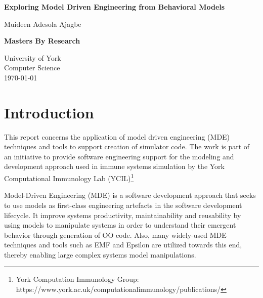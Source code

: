 \documentclass[12pt, a4paper]{report}
\begin{document}
\begin{titlepage}
 \begin{center}
\vspace{2cm}
\textbf{\large Exploring Model Driven Engineering from Behavioral Models}
\vspace{2cm}

Muideen Adesola Ajagbe\\

\vspace{3cm}

\textbf{Masters By Research}
\vspace{3cm}


University of York\\
Computer Science\\
\vspace{3cm}
\today
 
\vfill
 
\end{center}
\end{titlepage}

\begin{abstract}



\end{abstract}


\chapter{Introduction}

This report concerns the application of model driven engineering (MDE) techniques and tools to support creation of simulator code.  The work is part of an initiative to provide software engineering support for the modeling and development approach used in immune systems simulation by the York Computational Immunology Lab (YCIL)\footnote{York Computation Immunology Group: https://www.york.ac.uk/computationalimmunology/publications/}

Model-Driven Engineering (MDE) is a software development approach that seeks to use models as first-class engineering artefacts in the software development lifecycle. It improve systems productivity, maintainability and  reusability by using models to manipulate systems in order to understand their emergent behavior through generation of OO code. Also, many widely-used MDE techniques and tools such as EMF and Epsilon are utilized towards this end, thereby enabling large complex systems model manipulations.
\end{document}

